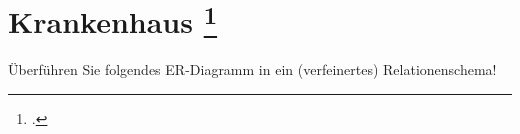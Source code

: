 \documentclass{lehramt-informatik-aufgabe}
\begin{document}

\section{Krankenhaus
\footcite{db:ab:klausurvorbereitung}}

Überführen Sie folgendes ER-Diagramm in ein (verfeinertes)
Relationenschema!
\end{document}
